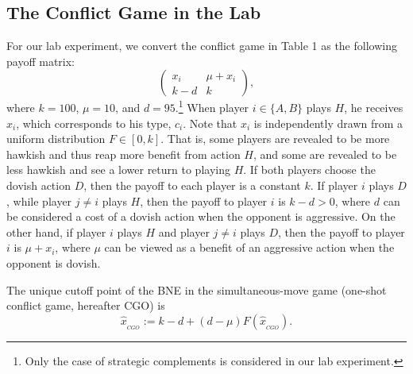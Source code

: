 \documentclass[12pt,english]{article}
\begin{document}
\subsection{The Conflict Game in the Lab}
\label{sec:model}
For our lab experiment, we convert the conflict game in Table 1 as the following payoff matrix:
\begin{equation}
\begin{pmatrix}
x_i & \mu+x_i \\
k-d & k 
\label{t:payoff}
\end{pmatrix},
\end{equation}
where $k=100$, $\mu=10$, and $d=95$.\footnote{Only the case of strategic complements is considered in our lab experiment.} When player $i \in \{A,B\}$ plays $H$, he receives $x_i$, which corresponds to his type, $c_i$. Note that $x_i$ is independently drawn from a uniform distribution $F\in [0,k]$. That is, some players are revealed to be more hawkish and thus reap more benefit from action $H$, and some are revealed to be less hawkish and see a lower return to playing $H$. If both players choose the dovish action $D$, then the payoff to each player is a constant $k$. If player $i$ plays $D$, while player $j\neq i$ plays $H$, then the payoff to player $i$ is $k-d>0$, where $d$ can be considered a cost of a dovish action when the opponent is aggressive. On the other hand, if player $i$ plays $H$ and player $j\neq i$ plays $D$, then the payoff to player $i$ is $\mu+x_i$, where $\mu$ can be viewed as a benefit of an aggressive action when the opponent is dovish.  \par
The unique cutoff point of the BNE in the simultaneous-move game (one-shot conflict game, hereafter CGO) is
\begin{equation}
\hat{x}_{_{CGO}}:= k-d + (d-\mu) F(\hat{x}_{_{CGO}}). \label{eq:cgo}
\end{equation}
\end{document}
